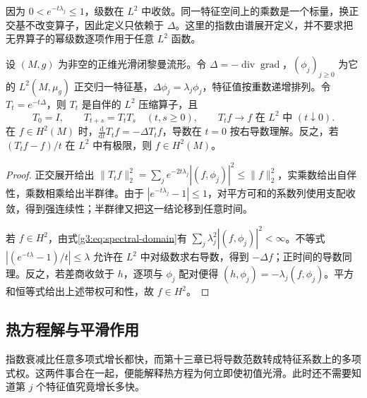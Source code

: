 因为 \(0<e^{-t\lambda_j}\le1\)，级数在 \(L^2\) 中收敛。同一特征空间上的乘数是一个标量，换正交基不改变算子，因此定义只依赖于 \(\Delta\)。这里的指数由谱展开定义，并不要求把无界算子的幂级数逐项作用于任意 \(L^2\) 函数。

\begin{proposition}\label{g3:prop:heat-semigroup-properties}
	设 \((M,g)\) 为非空的正维光滑闭黎曼流形。令 \(\Delta=-\operatorname{div}\operatorname{grad}\)，\((\phi_j)_{j\ge0}\) 为它的 \(L^2(M,\mu_g)\) 正交归一特征基，\(\Delta\phi_j=\lambda_j\phi_j\)，特征值按重数递增排列。令 \(T_t=e^{-t\Delta}\)，则 \(T_t\) 是自伴的 \(L^2\) 压缩算子，且
	\[
		T_0=I,\qquad T_{t+s}=T_tT_s\quad(t,s\ge0),\qquad
		T_tf\longrightarrow f\text{ 在 }L^2\text{ 中 }(t\downarrow0).
	\]
	在 \(f\in H^2(M)\) 时，\(\frac{\mathrm d}{\mathrm dt}T_tf=-\Delta T_tf\)，导数在 \(t=0\) 按右导数理解。反之，若 \((T_tf-f)/t\) 在 \(L^2\) 中有极限，则 \(f\in H^2(M)\)。
\end{proposition}
\begin{proof}
	正交展开给出 \(\|T_tf\|_2^2=\sum_j e^{-2t\lambda_j}|(f,\phi_j)|^2\le\|f\|_2^2\)，实乘数给出自伴性，乘数相乘给出半群律。由于 \(|e^{-t\lambda_j}-1|\le1\)，对平方可和的系数列使用支配收敛，得到强连续性；半群律又把这一结论移到任意时间。

	若 \(f\in H^2\)，由式\eqref{g3:eq:spectral-domain}有 \(\sum_j\lambda_j^2|(f,\phi_j)|^2<\infty\)。不等式 \(|(e^{-t\lambda}-1)/t|\le\lambda\) 允许在 \(L^2\) 中对级数求右导数，得到 \(-\Delta f\)；正时间的导数同理。反之，若差商收敛于 \(h\)，逐项与 \(\phi_j\) 配对便得 \((h,\phi_j)=-\lambda_j(f,\phi_j)\)。平方和恒等式给出上述带权可和性，故 \(f\in H^2\)。
\end{proof}

\subsection{热方程解与平滑作用}
\label{g3:subsec:1601:02}

指数衰减比任意多项式增长都快，而第十三章已将导数范数转成特征系数上的多项式权。这两件事合在一起，便能解释热方程为何立即使初值光滑。此时还不需要知道第 \(j\) 个特征值究竟增长多快。


